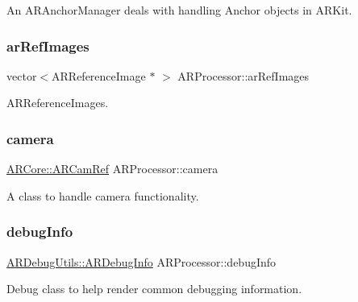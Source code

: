 An A\+R\+Anchor\+Manager deals with handling Anchor objects in A\+R\+Kit. 

\mbox{\label{class_a_r_processor_a153e891c386d86a01008ec655a4bbf20}} 
\subsubsection{\texorpdfstring{ar\+Ref\+Images}{arRefImages}}
{\footnotesize\ttfamily vector$<$A\+R\+Reference\+Image $\ast$ $>$ A\+R\+Processor\+::ar\+Ref\+Images\hspace{0.3cm}{\ttfamily [protected]}}



A\+R\+Reference\+Images. 

\mbox{\label{class_a_r_processor_a0df4995c56cb187db281726d7631d9ed}} 
\subsubsection{\texorpdfstring{camera}{camera}}
{\footnotesize\ttfamily \mbox{\hyperlink{namespace_a_r_core_a4ebe9e23907235fcf76bf65440fde0e0}{A\+R\+Core\+::\+A\+R\+Cam\+Ref}} A\+R\+Processor\+::camera}



A class to handle camera functionality. 

\mbox{\label{class_a_r_processor_a6b7b4d5ac724bd93a7828759f7f6da4e}} 
\subsubsection{\texorpdfstring{debug\+Info}{debugInfo}}
{\footnotesize\ttfamily \mbox{\hyperlink{class_a_r_debug_utils_1_1_a_r_debug_info}{A\+R\+Debug\+Utils\+::\+A\+R\+Debug\+Info}} A\+R\+Processor\+::debug\+Info}



Debug class to help render common debugging information. 

\mbox{\label{class_a_r_processor_a555e829fbf6b625537f6fd7cd9557002}} 

